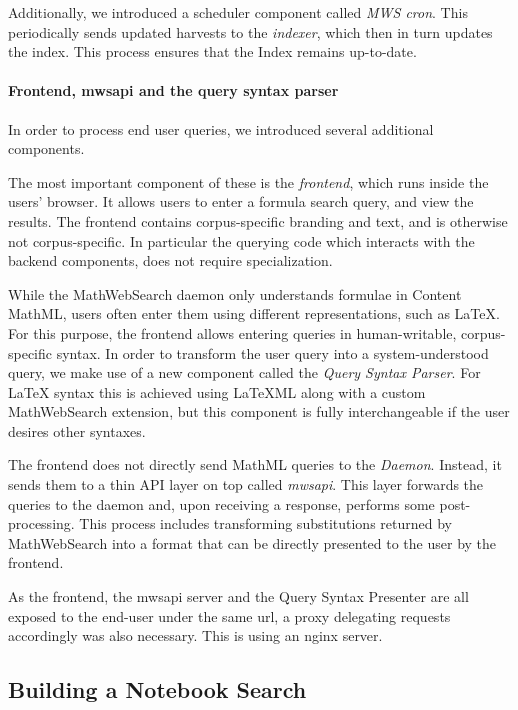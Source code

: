 Additionally, we introduced a scheduler component called \textit{MWS cron}. 
This periodically sends updated harvests to the \textit{indexer}, which then in turn updates the index. 
This process ensures that the Index remains up-to-date. 

\paragraph{Frontend, mwsapi and the query syntax parser}

In order to process end user queries, we introduced several additional components.

The most important component of these is the \textit{frontend}, which runs inside the users' browser. 
It allows users to enter a formula search query, and view the results. 
The frontend contains corpus-specific branding and text, and is otherwise not corpus-specific. 
In particular the querying code which interacts with the backend components, does not require specialization. 

While the MathWebSearch daemon only understands formulae in Content MathML, users often enter them using different representations, such as \LaTeX. 
For this purpose, the frontend allows entering queries in human-writable, corpus-specific syntax. 
In order to transform the user query into a system-understood query, we make use of a new component called the \textit{Query Syntax Parser}. 
For {\LaTeX} syntax this is achieved using {\LaTeX}ML along with a custom MathWebSearch extension, but this component is fully interchangeable if the user desires other syntaxes. 

The frontend does not directly send MathML queries to the \textit{Daemon}.
Instead, it sends them to a thin API layer on top called \textit{mwsapi}. 
This layer forwards the queries to the daemon and, upon receiving a response, performs some post-processing. 
This process includes transforming substitutions returned by MathWebSearch into a format that can be directly presented to the user by the frontend. 

As the frontend, the mwsapi server and the Query Syntax Presenter are all exposed to the end-user under the same url, a proxy delegating requests accordingly was also necessary. 
This is using an nginx  server. 

\subsection{Building a Notebook Search}

